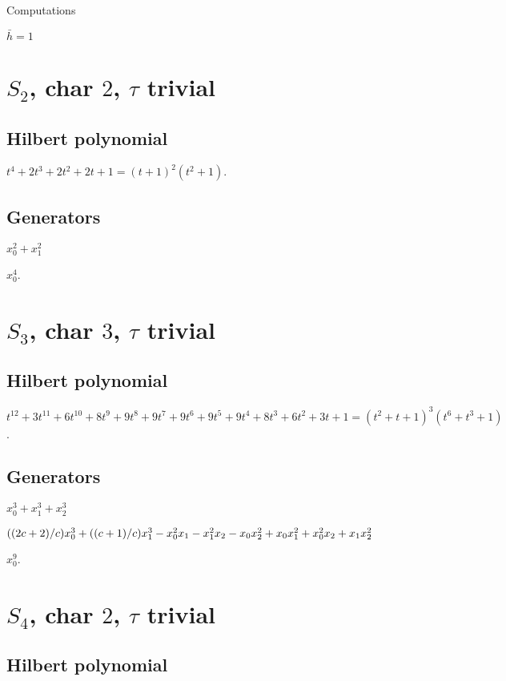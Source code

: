 \documentclass{article}
\numberwithin{equation}{section}
\begin{document}
{\Huge Computations}

{\huge $\bar{h}=1$}

\section{$S_2$, char $2$, $\tau$ trivial}

\subsection{Hilbert polynomial}

$t^4 + 2t^3 + 2t^2 + 2t + 1=(t + 1)^2  (t^2 + 1)$.

\subsection{Generators}

$x_0^2 + x_1^2$ 

$x_0^4$.

\section{$S_3$, char $3$, $\tau$ trivial}

\subsection{Hilbert polynomial}

$t^{12} + 3t^{11} + 6t^{10} + 8t^9 + 9t^8 + 9t^7 + 9t^6 + 9t^5 + 9t^4 +
8t^3 + 6t^2 + 3t + 1=(t^2 + t + 1)^3(t^6 + t^3 + 1)$.

\subsection{Generators}

 $x_0^3 + x_1^3 + x_2^3$ 

$((2c + 2)/c)x_0^3 \\
+ ((c + 1)/c)x_1^3\\
- x_0^2x_1 - x_1^2x_2 - x_0x_2^2\\
+ x_0x_1^2  + x_0^2x_2  + x_1x_2^2$


$x_0^9$.



\section{$S_4$, char $2$, $\tau$ trivial}

\subsection{Hilbert polynomial}
\end{document}
